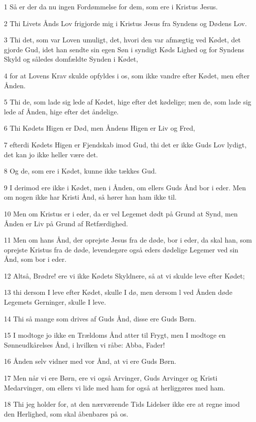 \par 1 Så er der da nu ingen Fordømmelse for dem, som ere i Kristus Jesus.
\par 2 Thi Livets Ånds Lov frigjorde mig i Kristus Jesus fra Syndens og Dødens Lov.
\par 3 Thi det, som var Loven umuligt, det, hvori den var afmægtig ved Kødet, det gjorde Gud, idet han sendte sin egen Søn i syndigt Køds Lighed og for Syndens Skyld og således domfældte Synden i Kødet,
\par 4 for at Lovens Krav skulde opfyldes i os, som ikke vandre efter Kødet, men efter Ånden.
\par 5 Thi de, som lade sig lede af Kødet, hige efter det kødelige; men de, som lade sig lede af Ånden, hige efter det åndelige.
\par 6 Thi Kødets Higen er Død, men Åndens Higen er Liv og Fred,
\par 7 efterdi Kødets Higen er Fjendskab imod Gud, thi det er ikke Guds Lov lydigt, det kan jo ikke heller være det.
\par 8 Og de, som ere i Kødet, kunne ikke tækkes Gud.
\par 9 I derimod ere ikke i Kødet, men i Ånden, om ellers Guds Ånd bor i eder. Men om nogen ikke har Kristi Ånd, så hører han ham ikke til.
\par 10 Men om Kristus er i eder, da er vel Legemet dødt på Grund at Synd, men Ånden er Liv på Grund af Retfærdighed.
\par 11 Men om hans Ånd, der oprejste Jesus fra de døde, bor i eder, da skal han, som oprejste Kristus fra de døde, levendegøre også eders dødelige Legemer ved sin Ånd, som bor i eder.
\par 12 Altså, Brødre! ere vi ikke Kødets Skyldnere, så at vi skulde leve efter Kødet;
\par 13 thi dersom I leve efter Kødet, skulle I dø, men dersom l ved Ånden døde Legemets Gerninger, skulle I leve.
\par 14 Thi så mange som drives af Guds Ånd, disse ere Guds Børn.
\par 15 I modtoge jo ikke en Trældoms Ånd atter til Frygt, men I modtoge en Sønneudkårelses Ånd, i hvilken vi råbe: Abba, Fader!
\par 16 Ånden selv vidner med vor Ånd, at vi ere Guds Børn.
\par 17 Men når vi ere Børn, ere vi også Arvinger, Guds Arvinger og Kristi Medarvinger, om ellers vi lide med ham for også at herliggøres med ham.
\par 18 Thi jeg holder for, at den nærværende Tids Lidelser ikke ere at regne imod den Herlighed, som skal åbenbares på os.
